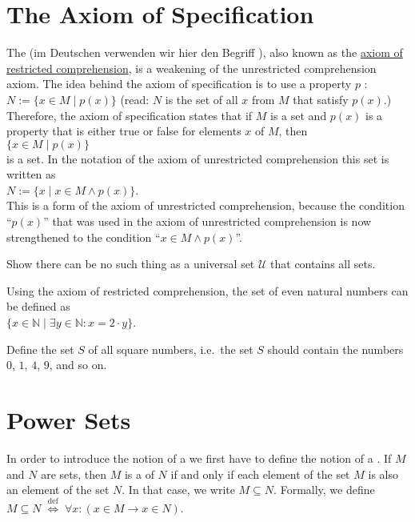 \section{The Axiom of Specification}
The  
(im Deutschen verwenden wir hier den Begriff ),
also known as the 
\href{https://en.wikipedia.org/wiki/Axiom_schema_of_specification}{axiom of restricted comprehension},
is a weakening of the unrestricted comprehension axiom.  The idea behind the axiom of specification
is to use a property $p$ : 
\\[0.2cm]
\hspace*{1.3cm}
$N := \{ x\in M \;|\; p(x) \}$ \qquad (read: $N$ is the set of all $x$ from $M$ that satisfy $p(x)$.)
\\[0.2cm]
Therefore,  the axiom of specification states that if $M$ is a set and $p(x)$ is a property that is either true
or false for elements $x$ of $M$, then 
\\[0.2cm]
\hspace*{1.3cm}
$\{ x\in M \;|\; p(x) \}$ 
\\[0.2cm]
is a set.  In the notation of the axiom of unrestricted comprehension this set is written as 
\\[0.2cm]
\hspace*{1.3cm}
$N := \{ x \mid x \in M \wedge p(x) \}$. 
\\[0.2cm]
This is a  form of the axiom of unrestricted comprehension, because the condition ``$p(x)$''
that was used in the axiom of unrestricted comprehension is now strengthened to the condition ``$x \in M \wedge p(x)$''.

\exercise
Show there can be no such thing as a universal set $\mathcal{U}$ that contains all sets.
\eox

\exampleEng
Using the axiom of restricted comprehension, the set of even natural numbers can be defined as 
\\[0.2cm]
\hspace*{1.3cm}
 $\{ x \in \mathbb{N} \;|\; \exists y\in \mathbb{N}: x = 2 \cdot y \}$. 

\exerciseEng
Define the set $S$ of all square numbers, i.e.~the set $S$ should contain the numbers $0$, $1$, $4$, $9$, and
so on.
\eox

\section{Power Sets}
In order to introduce the notion of a  we first have to define the notion of a .
If $M$ and $N$ are sets, then $M$ is a  of $N$ if and only if each element of the
set $M$ is also an element of the set $N$.  In that case, we write $M \subseteq N$.  Formally, we define
 \\[0.2cm]
\hspace*{1.3cm}
$M \subseteq N \;\stackrel{\mathrm{def}}{\Longleftrightarrow}\; \forall x: (x \in M \rightarrow x \in N)$.

